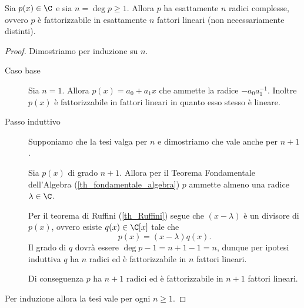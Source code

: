 \begin{corollary}\label{conseguenza_th_fondamentale}
    Sia $p(x) \in \C$ e sia $n = \deg p \geq 1$. Allora $p$ ha esattamente $n$ radici complesse, ovvero $p$ è fattorizzabile in esattamente $n$ fattori lineari (non necessariamente distinti).
\end{corollary}
\begin{proof}
    Dimostriamo per induzione su $n$.

    \begin{description}
        \item[Caso base] Sia $n = 1$. Allora $p(x) = a_0 + a_1x$ che ammette la radice $-a_0a_1^{-1}$. Inoltre $p(x)$ è fattorizzabile in fattori lineari in quanto esso stesso è lineare.
        \item[Passo induttivo] Supponiamo che la tesi valga per $n$ e dimostriamo che vale anche per $n + 1$.
        
        Sia $p(x)$ di grado $n+1$. Allora per il Teorema Fondamentale dell'Algebra (\ref{th_fondamentale_algebra}) $p$ ammette almeno una radice $\lambda \in \C$.

        Per il teorema di Ruffini (\ref{th_Ruffini}) segue che $(x - \lambda)$ è un divisore di $p(x)$, ovvero esiste $q(x) \in \C[x]$ tale che \[
            p(x) = (x - \lambda)q(x).    
        \] Il grado di $q$ dovrà essere $\deg p - 1 = n+1 - 1 = n$, dunque per ipotesi induttiva $q$ ha $n$ radici ed è fattorizzabile in $n$ fattori lineari.

        Di conseguenza $p$ ha $n+1$ radici ed è fattorizzabile in $n+1$ fattori lineari.
    \end{description}
    Per induzione allora la tesi vale per ogni $n \geq 1$.
\end{proof}

